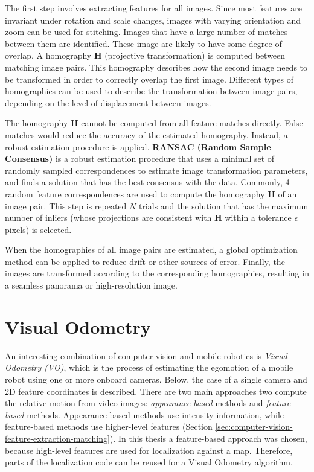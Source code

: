 The first step involves extracting features for all images.
Since most features are invariant under rotation and scale changes, images with varying orientation and zoom can be used for stitching.
Images that have a large number of matches between them are identified.
These image are likely to have some degree of overlap.
A homography $\boldsymbol{H}$ (projective transformation) is computed between matching image pairs.
This homography describes how the second image needs to be transformed in order to correctly overlap the first image.
Different types of homographies can be used to describe the transformation between image pairs, depending on the level of displacement between images.

The homography $\boldsymbol{H}$ cannot be computed from all feature matches directly.
False matches would reduce the accuracy of the estimated homography.
Instead, a robust estimation procedure is applied.
\textbf{RANSAC (Random Sample Consensus)} \cite{fischler1981random} is a robust estimation procedure that uses a minimal set of randomly sampled correspondences to estimate image transformation parameters, and finds a solution that has the best consensus with the data.
Commonly, 4 random feature correspondences are used to compute the homography $\boldsymbol{H}$ of an image pair.
This step is repeated $N$ trials and the solution that has the maximum number of inliers (whose projections are consistent with $\boldsymbol{H}$ within a tolerance $\epsilon$ pixels) is selected.

When the homographies of all image pairs are estimated, a global optimization method can be applied to reduce drift or other sources of error.
Finally, the images are transformed according to the corresponding homographies, resulting in a seamless panorama or high-resolution image. 


\section{Visual Odometry}
\label{sec:background-visual-odometry}
An interesting combination of computer vision and mobile robotics is \textit{Visual Odometry (VO)}, which is the process of estimating the egomotion of a mobile robot using one or more onboard cameras.
Below,
the case of a single camera and 2D feature coordinates is described.
There are two main approaches two compute the relative motion from video images: \textit{appearance-based} methods and \textit{feature-based} methods.
Appearance-based methods use intensity information, while feature-based methods use higher-level features (Section \ref{sec:computer-vision-feature-extraction-matching}).
In this thesis a feature-based approach was chosen, because high-level features are used for localization against a map.
Therefore, parts of the localization code can be reused for a Visual Odometry algorithm.

